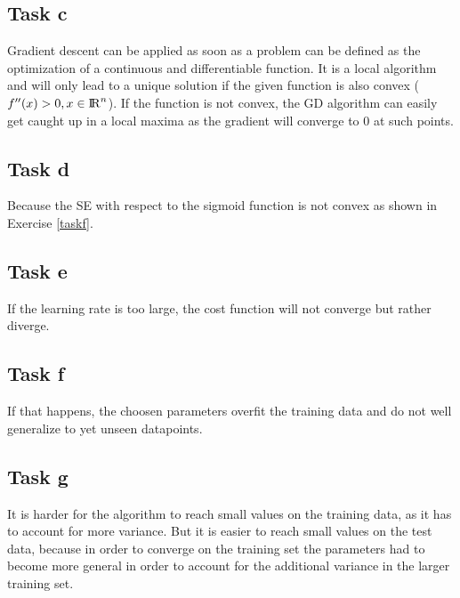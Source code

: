 \documentclass[onecolumn]{article}
\begin{document}
\subsection{Task c}
Gradient descent can be applied as soon as a problem can be defined as the optimization of a continuous and differentiable function. It is a local algorithm and will only lead to a unique solution if the given function is also convex ($f^{\prime\prime}(x)>0, x \in {\rm I\!R}^n$). If the function is not convex, the GD algorithm can easily get caught up in a local maxima as the gradient will converge to $0$ at such points.

\subsection{Task d}
Because the SE with respect to the sigmoid function is not convex as shown in Exercise \ref{taskf}.

\subsection{Task e}
If the learning rate is too large, the cost function will not converge but rather diverge.

\subsection{Task f}
If that happens, the choosen parameters overfit the training data and do not well generalize to yet unseen datapoints.

\subsection{Task g}
It is harder for the algorithm to reach small values on the training data, as it has to account for more variance. But it is easier to reach small values on the test data, because in order to converge on the training set the parameters had to become more general in order to account for the additional variance in the larger training set.
\end{document}
